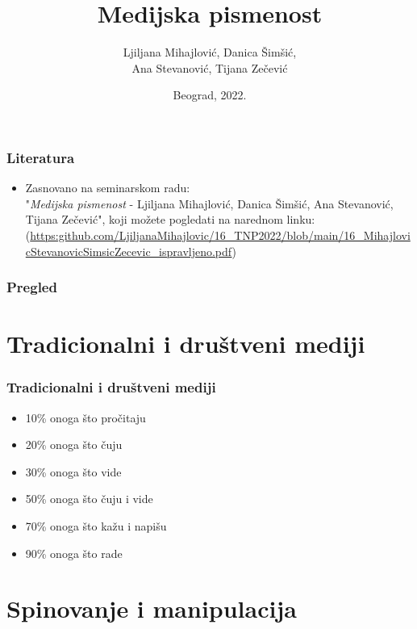 \documentclass[13pt]{beamer}
\title{Medijska pismenost}
\author{Ljiljana Mihajlović, Danica Šimšić,\\ Ana Stevanović, Tijana Zečević}
\institute{Matematički fakultet \\Univerzitet u Beogradu}
\date{
	\footnotesize{Beograd, 2022.}	
}
\begin{document}
\begin{frame}
	\thispagestyle{empty}
	\titlepage
\end{frame}

\addtocounter{framenumber}{-1}

\begin{frame}
\frametitle{Literatura}
	\begin{itemize}
		\item Zasnovano na seminarskom radu:\\
		 "\emph{Medijska pismenost} - Ljiljana Mihajlović, Danica Šimšić, Ana Stevanović, Tijana Zečević", koji možete pogledati na narednom linku:\\
(\url{https:github.com/LjiljanaMihajlovic/16_TNP2022/blob/main/16_MihajlovicStevanovicSimsicZecevic_ispravljeno.pdf})
  
	\end{itemize}
\end{frame}

\begin{frame}
	\frametitle{Pregled} %
	\tableofcontents[hidesubsections] 
\end{frame}

\section{Tradicionalni i društveni mediji}

\begin{frame}[fragile]\frametitle{Tradicionalni i društveni mediji}
	\begin{itemize}	
		\item 10\% onoga što pročitaju
		\item 20\% onoga što čuju
		\item 30\% onoga što vide
		\item 50\% onoga što čuju i vide
		\item 70\% onoga što kažu i napišu
		\item 90\% onoga što rade
	\end{itemize}
\end{frame}

\section{Spinovanje i manipulacija}
\end{document}
